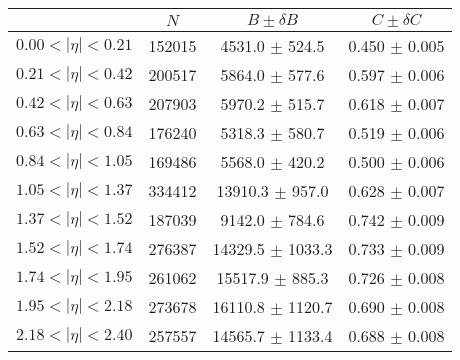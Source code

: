 \begin{tabular}{lccc}
\hline
    &   $N$   & $B \pm \delta B$  &  $C \pm \delta C$ \\
\hline
$0.00 < |\eta| <0.21$          & 152015     & 4531.0     $\pm$ 524.5 & 0.450      $\pm$ 0.005 \\
$0.21 < |\eta| <0.42$          & 200517     & 5864.0     $\pm$ 577.6 & 0.597      $\pm$ 0.006 \\
$0.42 < |\eta| <0.63$          & 207903     & 5970.2     $\pm$ 515.7 & 0.618      $\pm$ 0.007 \\
$0.63 < |\eta| <0.84$          & 176240     & 5318.3     $\pm$ 580.7 & 0.519      $\pm$ 0.006 \\
$0.84 < |\eta| <1.05$          & 169486     & 5568.0     $\pm$ 420.2 & 0.500      $\pm$ 0.006 \\
$1.05 < |\eta| <1.37$          & 334412     & 13910.3    $\pm$ 957.0 & 0.628      $\pm$ 0.007 \\
$1.37 < |\eta| <1.52$          & 187039     & 9142.0     $\pm$ 784.6 & 0.742      $\pm$ 0.009 \\
$1.52 < |\eta| <1.74$          & 276387     & 14329.5    $\pm$ 1033.3 & 0.733      $\pm$ 0.009 \\
$1.74 < |\eta| <1.95$          & 261062     & 15517.9    $\pm$ 885.3 & 0.726      $\pm$ 0.008 \\
$1.95 < |\eta| <2.18$          & 273678     & 16110.8    $\pm$ 1120.7 & 0.690      $\pm$ 0.008 \\
$2.18 < |\eta| <2.40$          & 257557     & 14565.7    $\pm$ 1133.4 & 0.688      $\pm$ 0.008 \\
\hline
\end{tabular}
